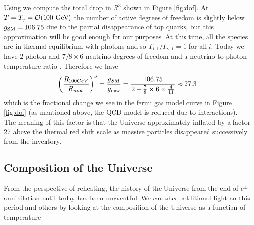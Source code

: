 Using  we compute the total drop in $R^3$ shown in Figure \ref{fig:dof}. At $T=T_\gamma=\mathcal{O}(100\text{ GeV})$ the number of active degrees of freedom is slightly below $g_{\rm SM}=106.75$ due to the partial disappearance of top quarks, but this approximation will be good enough for our purposes. At this time, all the species are in thermal equilibrium with photons and so $T_{i,1}/T_{\gamma,1}=1$ for all $i$. Today we have $2$ photon and $7/8\times 6$ neutrino degrees of freedom and a neutrino to photon temperature ratio . Therefore we have
\begin{equation}
\left(\frac{R_{100GeV}}{R_{now}}\right)^3= \frac{g_{SM}}{g_{\rm now}}=\frac{106.75}{2+\frac{7}{8}\times 6\times \frac{4}{11}}\approx 27.3
\end{equation}
which is the fractional change we see in the fermi gas model curve in Figure \ref{fig:dof} (as mentioned above, the QCD model is reduced due to interactions). The meaning of this factor is that the Universe approximately inflated by a factor 27 above the thermal red shift scale as massive particles disappeared successively from the inventory. 

\subsection{Composition of the Universe}
From the perspective of reheating, the history of the Universe from the end of $e^\pm$ annihilation until today has been uneventful. We can shed additional light on this period and others by looking at the composition of the Universe as a function of temperature

